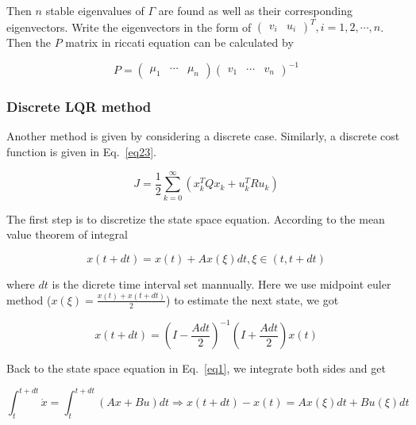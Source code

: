 \documentclass[hyperref]{article}
\theoremstyle{nonumberplain}
\begin{document}
	Then $n$ stable eigenvalues of $\Gamma$ are found as well as their corresponding eigenvectors. Write the eigenvectors in the form of $\begin{pmatrix}
	v_{i} & u_{i}
	\end{pmatrix}^{T},i=1,2,\cdots ,n$. Then the $P$ matrix in riccati equation can be calculated by
	
	\begin{equation}
	P=\begin{pmatrix}
	\mu _{1} &\cdots   & \mu _{n}
	\end{pmatrix}
	\begin{pmatrix}
	v_{1} &\cdots   & v_{n}
	\end{pmatrix}^{-1}
	\label{eq22}
	\end{equation}
	
	\subsubsection{Discrete LQR method}
	
	\hspace{1.0em}
	Another method is given by considering a discrete case. Similarly, a discrete cost function is given in Eq.~\ref{eq23}.
	
	\begin{equation}
	J=\frac{1}{2}\sum_{k=0}^{\infty}(x_{k}^{T}Qx_{k}+u_{k}^{T}Ru_{k})
	\label{eq23}
	\end{equation}
	
	The first step is to discretize the state space equation. According to the mean value theorem of integral
	
	\begin{equation}
	x(t+dt)=x(t)+Ax(\xi )dt, \xi \in (t,t+dt)
	\label{eq24}
	\end{equation}
	
	where $dt$ is the dicrete time interval set mannually. Here we use midpoint euler method ($x(\xi)=\frac{x(t)+x(t+dt)}{2}$) to estimate the next state, we got
	
	\begin{equation}
	x(t+dt)=(I-\frac{Adt}{2})^{-1}(I+\frac{Adt}{2})x(t)
	\label{eq25}
	\end{equation}
	
	Back to the state space equation in Eq.~\ref{eq1}, we integrate both sides and get
	
	\begin{equation}
	\int_{t}^{t+dt}\dot{x}=\int_{t}^{t+dt}(Ax+Bu)dt\Rightarrow x(t+dt)-x(t)=Ax(\xi )dt+Bu(\xi)dt
	\label{eq26}
	\end{equation}
	
\end{document}
